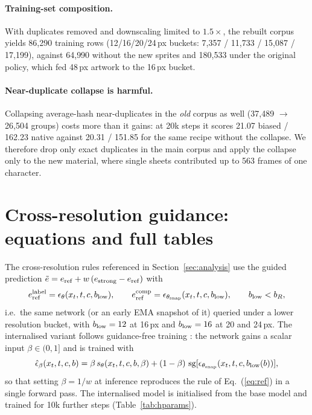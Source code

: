 \paragraph{Training-set composition.}
With duplicates removed and downscaling limited to $1.5\times$, the rebuilt corpus yields 86{,}290 training rows
(12/16/20/24\,px buckets: 7{,}357 / 11{,}733 / 15{,}087 / 17{,}199), against 64{,}990 without the new sprites and
180{,}533 under the original policy, which fed 48\,px artwork to the 16\,px bucket.

\paragraph{Near-duplicate collapse is harmful.}
Collapsing average-hash near-duplicates in the \emph{old} corpus as well (37{,}489 $\to$ 26{,}504 groups) costs more
than it gains: at 20k steps it scores 21.07 biased / 162.23 native against 20.31 / 151.85 for the same recipe without
the collapse. We therefore drop only exact duplicates in the main corpus and apply the collapse only to the new
material, where single sheets contributed up to 563 frames of one character.

\section{Cross-resolution guidance: equations and full tables}
\label{app:crossres}

The cross-resolution rules referenced in Section~\ref{sec:analysis} use the guided prediction
$\tilde e = e_{\mathrm{ref}} + w\,(e_{\text{strong}} - e_{\mathrm{ref}})$ with
\begin{equation}
  e_{\mathrm{ref}}^{\text{label}} = \epsilon_\theta(x_t, t, c, b_{\mathrm{low}}), \qquad
  e_{\mathrm{ref}}^{\text{comp}} = \epsilon_{\theta_{\text{snap}}}(x_t, t, c, b_{\mathrm{low}}), \qquad b_{\mathrm{low}} < b_R,
  \label{eq:ref}
\end{equation}
i.e.\ the same network (or an early EMA snapshot of it) queried under a lower resolution bucket, with $b_{\mathrm{low}} = 12$ at
16\,px and $b_{\mathrm{low}} = 16$ at 20 and 24\,px. The internalised variant follows guidance-free training \citep{Chen2025gft}:
the network gains a scalar input $\beta \in (0,1]$ and is trained with
\begin{equation}
  \hat\epsilon_\beta(x_t, t, c, b) = \beta\,s_\theta(x_t, t, c, b, \beta) + (1-\beta)\,\operatorname{sg}[\epsilon_{\theta_{\text{snap}}}(x_t, t, c, b_{\mathrm{low}}(b))],
  \label{eq:gft}
\end{equation}
so that setting $\beta = 1/w$ at inference reproduces the rule of Eq.~(\ref{eq:ref}) in a single forward pass. The
internalised model is initialised from the base model and trained for 10k further steps (Table~\ref{tab:hparams}).

